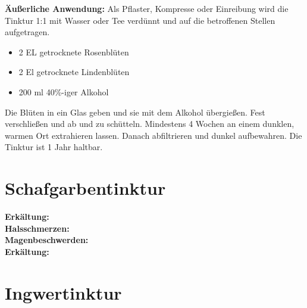 \textbf{Äußerliche Anwendung:} Als Pflaster, Kompresse oder Einreibung wird die Tinktur 1:1 mit Wasser oder Tee verdünnt und auf die betroffenen Stellen aufgetragen.\\



\begin{itemize}
	\item 2 EL getrocknete Rosenblüten
	\item 2 El getrocknete Lindenblüten
	\item 200 ml 40\%-iger Alkohol
\end{itemize}

Die Blüten in ein Glas geben und sie mit dem Alkohol übergießen. Fest verschließen und ab und zu schütteln. Mindestens 4 Wochen an einem dunklen, warmen Ort extrahieren lassen. Danach abfiltrieren und dunkel aufbewahren. Die Tinktur ist 1 Jahr haltbar.




\newpage


\section{Schafgarbentinktur}
\label{   }

   

\textbf{Erkältung:} \\ 

\textbf{Halsschmerzen:} \\ 

\textbf{Magenbeschwerden:} \\ 

\textbf{Erkältung:} \\ 




\newpage

\section{Ingwertinktur}
\label{   }

